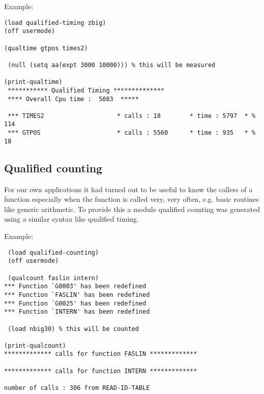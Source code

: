 

Example:

\begin{verbatim}
(load qualified-timing zbig)
(off usermode)

(qualtime gtpos times2)

 (null (setq aa(expt 3000 10000))) % this will be measured

(print-qualtime)
 *********** Qualified Timing **************
 **** Overall Cpu time :  5083  *****

 *** TIMES2                    * calls : 18        * time : 5797  * % 114
 *** GTPOS                     * calls : 5560      * time : 935   * % 18

\end{verbatim}

\subsection{Qualified counting}

For our own applications it had turned out to be useful to know the
callers of a function especially when the function is called very,
very often, e.g. basic routines like generic arithmetic. To 
provide this a module qualified counting was generated using a similar
syntax like qualified timing.
\\




Example:

\begin{verbatim}
 (load qualified-counting)
 (off usermode)

 (qualcount faslin intern)
*** Function `G0003' has been redefined
*** Function `FASLIN' has been redefined
*** Function `G0025' has been redefined
*** Function `INTERN' has been redefined

 (load nbig30) % this will be counted

(print-qualcount)
************* calls for function FASLIN *************

************* calls for function INTERN *************

number of calls : 306 from READ-ID-TABLE
\end{verbatim}


